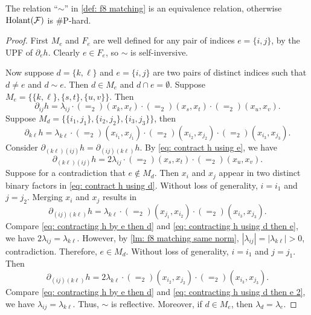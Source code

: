 \begin{lemma}\label{lm: f8 matching equivalence}
    The relation ``$\sim$'' in \cref{def: f8 matching} is an equivalence relation, otherwise $\operatorname{Holant}(\mathcal{F})$ is \#P-hard.
\end{lemma}
\begin{proof}
    First $M_e$ and $F_e$ are well defined for any pair of indices $e=\{i,j\}$, by the UPF of $\partial_eh.$
    Clearly $e\in F_e$, so $\sim$ is self-inversive.
    
    Now suppose $d=\{k,\ell\}$ and $e=\{i,j\}$ are two pairs of distinct indices such that $d\neq e$ and $d\sim e$. 
    Then $d\in M_e$ and $d\cap e=\emptyset.$
    Suppose $M_e=\{\{k,\ell\},\{s,t\},\{u,v\}\}.$
    Then
    \begin{equation}\label{eq: contract h using e}
        \partial_{ij}h=\lambda_{ij}\cdot (=_2)(x_{k},x_{\ell})\cdot (=_2)(x_{s},x_{t})\cdot (=_2)(x_{u},x_{v}).
    \end{equation}
    Suppose $M_d=\{\{i_1,j_1\},\{i_2,j_2\},\{i_3,j_3\}\}$, then 
    \begin{equation}\label{eq: contract h using d}
        \partial_{k\ell}h=\lambda_{k\ell}\cdot (=_2)(x_{i_1},x_{j_1})\cdot (=_2)(x_{i_2},x_{j_2})\cdot (=_2)(x_{i_3},x_{j_3}).
    \end{equation}
    Consider $\partial_{(k\ell)(ij)}h=\partial_{(ij)(k\ell)}h$.
    By \eqref{eq: contract h using e}, we have 
    \begin{equation}\label{eq: contracting h by e then d}
        \partial_{(k\ell)(ij)}h=2\lambda_{ij}\cdot (=_2)(x_{s},x_{t})\cdot (=_2)(x_{u},x_{v}).
    \end{equation} 
    Suppose for a contradiction that $e\notin M_d$.
    Then $x_i$ and $x_j$ appear in two distinct binary factors in \eqref{eq: contract h using d}. 
    Without loss of generality, $i=i_1$ and $j=j_2$.
    Merging $x_i$ and $x_j$ results in 
    \begin{equation}\label{eq: contracting h using d then e}
        \partial_{(ij)(k\ell)}h=\lambda_{k\ell}\cdot (=_2)(x_{j_1},x_{i_2})\cdot (=_2)(x_{i_3},x_{j_3}).
    \end{equation}
    Compare \eqref{eq: contracting h by e then d} and \eqref{eq: contracting h using d then e}, we have $2\lambda_{ij}=\lambda_{k\ell}.$
    However, by \cref{lm: f8 matching same norm}, $|\lambda_{ij}|=|\lambda_{k\ell}|>0$, contradiction.
    Therefore, $e\in M_d$.
    Without loss of generality, $i=i_1$ and $j=j_1$.
    Then 
    \begin{equation}\label{eq: contracting h using d then e 2}
        \partial_{(ij)(k\ell)}h=2\lambda_{k\ell}\cdot (=_2)(x_{i_2},x_{j_2})\cdot (=_2)(x_{i_3},x_{j_3}).
    \end{equation}
    Compare \eqref{eq: contracting h by e then d} and \eqref{eq: contracting h using d then e 2}, we have $\lambda_{ij}=\lambda_{k\ell}.$
    Thus, $\sim$ is reflective.
    Moreover, if $d\in M_e$, then $\lambda_d=\lambda_e.$


\end{proof}
